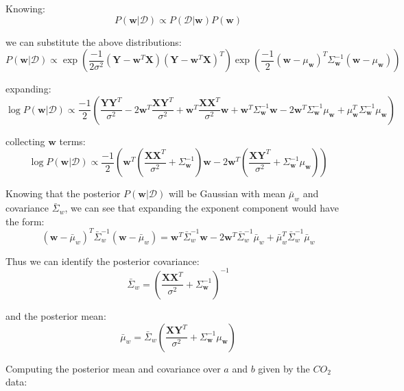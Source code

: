 \documentclass[12pt]{article}
\begin{document}
Knowing:
\[P(\textbf{w} | \mathcal{D}) \propto P(\mathcal{D} | \textbf{w}) P(\textbf{w})\]

we can substitute the above distributions:
\[P(\textbf{w} | \mathcal{D}) \propto
  \exp \left(\frac{-1}{2 \sigma^2} \left( \textbf{Y} - \textbf{w}^T \textbf{X}\right) \left( \textbf{Y} - \textbf{w}^T \textbf{X}\right)^T \right)
\exp \left(\frac{-1}{2} \left( \textbf{w} -\mu_{\textbf{w}}\right)^T \Sigma_{\textbf{w}}^{-1} \left( \textbf{w} -\mu_{\textbf{w}}\right)\right)
\]

expanding:
\[\log P(\textbf{w} | \mathcal{D}) \propto
  \frac{-1}{2} \left( \frac{\textbf{Y} \textbf{Y}^T}{\sigma^2} - 2\textbf{w}^T \frac{\textbf{X}\textbf{Y}^T}{\sigma^2} + \textbf{w}^T \frac{\textbf{X} \textbf{X}^T}{\sigma^2} \textbf{w} +  \textbf{w}^T \Sigma_{\textbf{w}}^{-1}  \textbf{w} - 2\textbf{w}^T \Sigma_{\textbf{w}}^{-1}\mu_{\textbf{w}} + \mu_{\textbf{w}}^T\Sigma_{\textbf{w}}^{-1}\mu_{\textbf{w}} \right)
\]

collecting $\textbf{w}$ terms:
\[\log P(\textbf{w} | \mathcal{D}) \propto
  \frac{-1}{2} \left( \textbf{w}^T \left(\frac{\textbf{X} \textbf{X}^T}{\sigma^2} + \Sigma_{\textbf{w}}^{-1} \right)  \textbf{w} - 2\textbf{w}^T \left(\frac{\textbf{X}\textbf{Y}^T}{\sigma^2} + \Sigma_{\textbf{w}}^{-1} \mu_{\textbf{w}}\right)  \right)
\]

Knowing that the posterior $P(\textbf{w} | \mathcal{D})$ will be Gaussian with mean $\bar{\mu}_w$ and covariance $\bar{\Sigma}_w$, we can see that expanding the exponent component would have the form:
\[\left( \textbf{w} - \bar{\mu}_w \right)^T \bar{\Sigma}_w^{-1} \left( \textbf{w} - \bar{\mu}_w \right) = \textbf{w}^T \bar{\Sigma}_w^{-1} \textbf{w} -2 \textbf{w}^T \bar{\Sigma}_w^{-1} \bar{\mu}_w + \bar{\mu}_w^T \bar{\Sigma}_w^{-1} \bar{\mu}_w\]

Thus we can identify the posterior covariance:
\[\bar{\Sigma}_w = \left(\frac{\textbf{X} \textbf{X}^T}{\sigma^2} + \Sigma_{\textbf{w}}^{-1} \right)^{-1}\]

and the posterior mean:
\[\bar{\mu}_w = \bar{\Sigma}_w \left(\frac{\textbf{X}\textbf{Y}^T}{\sigma^2} + \Sigma_{\textbf{w}}^{-1} \mu_{\textbf{w}}\right) \]

\newpage
Computing the posterior mean and covariance over $a$ and $b$ given by the $CO_2$ data:
\end{document}
